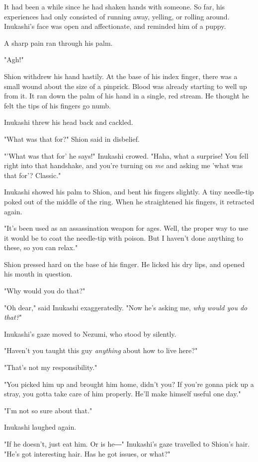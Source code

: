 It had been a while since he had shaken hands with someone. So far, his
experiences had only consisted of running away, yelling, or rolling
around. Inukashi's face was open and affectionate, and reminded him of a
puppy.

A sharp pain ran through his palm.

"Agh!"

Shion withdrew his hand hastily. At the base of his index finger, there
was a small wound about the size of a pinprick. Blood was already
starting to well up from it. It ran down the palm of his hand in a
single, red stream. He thought he felt the tips of his fingers go numb.

Inukashi threw his head back and cackled.

"What was that for?" Shion said in disbelief.

"'What was that for' he says!" Inukashi crowed. "Haha, what a surprise!
You fell right into that handshake, and you're turning on \emph{me} and asking
me 'what was that for'? Classic."

Inukashi showed his palm to Shion, and bent his fingers slightly. A tiny
needle-tip poked out of the middle of the ring. When he straightened his
fingers, it retracted again.

"It's been used as an assassination weapon for ages. Well, the proper
way to use it would be to coat the needle-tip with poison. But I haven't
done anything to these, so you can relax."

Shion pressed hard on the base of his finger. He licked his dry lips,
and opened his mouth in question.

"Why would you do that?"

"Oh dear," said Inukashi exaggeratedly. "Now he's asking me, \emph{why would
	you do that?}"

Inukashi's gaze moved to Nezumi, who stood by silently.

"Haven't you taught this guy \emph{anything} about how to live here?"

"That's not my responsibility."

"You picked him up and brought him home, didn't you? If you're gonna
pick up a stray, you gotta take care of him properly. He'll make himself
useful one day."

"I'm not so sure about that."

Inukashi laughed again.

"If he doesn't, just eat him. Or is he―" Inukashi's gaze travelled to
Shion's hair. "He's got interesting hair. Has he got issues, or what?"

